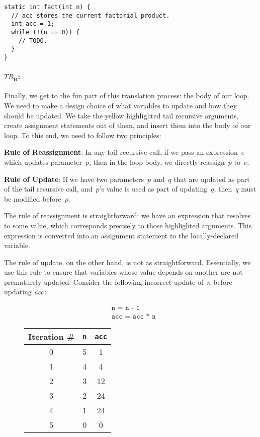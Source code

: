 \begin{lstlisting}[language=MyJava]
static int fact(int n) {
  // acc stores the current factorial product. 
  int acc = 1;
  while (!(n == 0)) { 
    // TODO.
  }
}
\end{lstlisting}

\paragraph{\emph{$TR_\mathbf{B}$}:} Finally, we get to the fun part of this translation process: the body of our loop. 
We need to make a design choice of what variables to update and how they should be updated. 
We take the \textcolor{darkyellow}{yellow} highlighted tail recursive arguments, create assignment statements out of them, and insert them into the body of our loop. 
To this end, we need to follow two principles:

\textbf{Rule of Reassignment}: In any tail recursive call, if we pass an expression~$e$ which updates parameter~$p$, then in the loop body, we directly reassign~$p$ to~$e$.

\textbf{Rule of Update}: If we have two parameters~$p$ and~$q$ that are updated as part of the tail recursive call, and~$p$'s value is used as part of updating~$q$, then~$q$ must be modified before~$p$.

The rule of reassignment is straightforward: we have an expression that resolves to some value, which corresponds precisely to those highlighted arguments. 
This expression is converted into an assignment statement to the locally-declared variable. 

The rule of update, on the other hand, is not as straightforward. 
Essentially, we use this rule to ensure that variables whose value depends on another are not prematurely updated. 
Consider the following incorrect update of~$n$ before updating $\emph{acc}$:
\begin{figure}[H]
\centering
\begin{minipage}{.4\textwidth}
  \begin{align*}
  &\texttt{n = n - 1}\\
  &\texttt{acc = acc * n}
  \end{align*}
\end{minipage}%
\begin{minipage}{.4\textwidth}
\begin{tabular}{c|c|c}
Iteration \# & \texttt{n} & \texttt{acc}\\
\hline
\hline
0 & 5 & 1\\
\hline
1 & 4 & 4\\
\hline
2 & 3 & 12\\
\hline
3 & 2 & 24\\
\hline
4 & 1 & 24\\
\hline
5 & 0 & 0\\
\end{tabular}
\end{minipage}
\end{figure}

